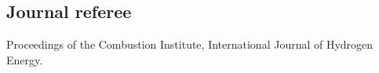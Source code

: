 \subsection{Journal referee}
Proceedings of the Combustion Institute, International Journal of Hydrogen Energy.
